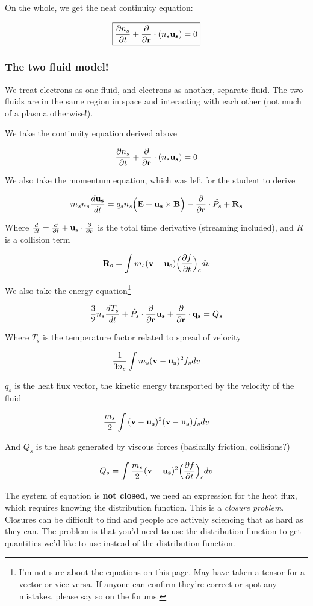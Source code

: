 \documentclass[PlasmaNotes.tex]{subfiles}
\begin{document}
On the whole, we get the neat continuity equation:

\begin{equation}
\boxed{\frac{\partial n_s}{\partial t} + \frac{\partial }{\partial \mathbf{r}} \cdot (n_s \mathbf{u_s}) = 0}
\end{equation}
\subsubsection{The two fluid model!}

We treat electrons as one fluid, and electrons as another, separate fluid. The two fluids are in the same region in space and interacting with each other (not much of a plasma otherwise!).

We take the continuity equation derived above

\[ \frac{\partial n_s}{\partial t} + \frac{\partial }{\partial \mathbf{r}} \cdot (n_s \mathbf{u_s}) = 0 \]

We also take the momentum equation, which was left for the student to derive

\[ m_s n_s \frac{d \mathbf{u_s}}{d t} = q_s n_s \Big( \mathbf{E} + \mathbf{u_s} \times \mathbf{B} \Big) - \frac{\partial }{\partial \mathbf{r}} \cdot \hat{P_s} + \mathbf{R_s} \]

Where $\frac{d }{d t} = \frac{\partial }{\partial t} + \mathbf{u_s} \cdot \frac{\partial }{\partial \mathbf{r}}$ is the total time derivative (streaming included), and $R$ is a collision term

\[ \mathbf{R_s} = \int{m_s (\ensuremath{\mathbf{v}} - \ensuremath{\mathbf{u_s}}) \Big( \frac{\partial f}{\partial t} \Big)_c dv} \]

We also take the energy equation\footnote{I'm not sure about the equations on this page. May have taken a tensor for a vector or vice versa. If anyone can confirm they're correct or spot any mistakes, please say so on the forums.}

\[ \frac{3}{2} n_s \frac{d T_s}{d t} + \hat{P_s} \cdot \frac{\partial }{\partial \mathbf{r}} \mathbf{u_s} + \frac{\partial }{\partial \mathbf{r}} \cdot \mathbf{q_s} = Q_s \]

Where $T_s$ is the temperature factor related to spread of velocity

\[ \frac{1}{3 n_s} \int{m_s (\ensuremath{\mathbf{v}} - \ensuremath{\mathbf{u_s}})^2 f_s dv} \]

$q_s$ is the heat flux vector, the kinetic energy transported by the velocity of the fluid

\[ \frac{m_s}{2} \int{(\ensuremath{\mathbf{v}}-\ensuremath{\mathbf{u_s}})^2 (\ensuremath{\mathbf{v}}-\ensuremath{\mathbf{u_s}}) f_s dv} \]

And $Q_s$ is the heat generated by viscous forces (basically friction, collisions?)

\[ Q_s = \int{\frac{m_s}{2} (\ensuremath{\mathbf{v}}-\ensuremath{\mathbf{u_s}})^2 \Big(\frac{\partial f}{\partial t}\Big)_c dv} \]

The system of equation is \textbf{not closed}, we need an expression for the heat flux, which requires knowing the distribution function. This is a \emph{closure problem}. Closures can be difficult to find and people are actively sciencing that as hard as they can. The problem is that you'd need to use the distribution function to get quantities we'd like to use instead of the distribution function.
\end{document}
